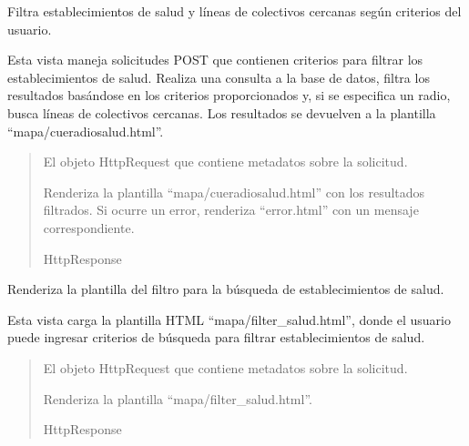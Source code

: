\documentclass[letterpaper,10pt,spanish]{sphinxmanual}
\begin{document}
\begin{fulllineitems}

\pysigstartsignatures
{}
\pysigstopsignatures
\sphinxAtStartPar
Filtra establecimientos de salud y líneas de colectivos cercanas según criterios del usuario.

\sphinxAtStartPar
Esta vista maneja solicitudes POST que contienen criterios para filtrar los
establecimientos de salud. Realiza una consulta a la base de datos, filtra
los resultados basándose en los criterios proporcionados y, si se especifica
un radio, busca líneas de colectivos cercanas. Los resultados se devuelven
a la plantilla “mapa/cueradiosalud.html”.
\begin{quote}\begin{description}
\sphinxAtStartPar
{} \textendash{} El objeto HttpRequest que contiene metadatos sobre la solicitud.

\sphinxAtStartPar
Renderiza la plantilla “mapa/cueradiosalud.html” con los resultados filtrados.
Si ocurre un error, renderiza “error.html” con un mensaje correspondiente.

\sphinxAtStartPar
HttpResponse

\end{description}\end{quote}

\end{fulllineitems}



\begin{fulllineitems}

\pysigstartsignatures
{}
\pysigstopsignatures
\sphinxAtStartPar
Renderiza la plantilla del filtro para la búsqueda de establecimientos de salud.

\sphinxAtStartPar
Esta vista carga la plantilla HTML “mapa/filter\_salud.html”, donde el usuario
puede ingresar criterios de búsqueda para filtrar establecimientos de salud.
\begin{quote}\begin{description}
\sphinxAtStartPar
{} \textendash{} El objeto HttpRequest que contiene metadatos sobre la solicitud.

\sphinxAtStartPar
Renderiza la plantilla “mapa/filter\_salud.html”.

\sphinxAtStartPar
HttpResponse

\end{description}\end{quote}

\end{fulllineitems}
\end{document}
